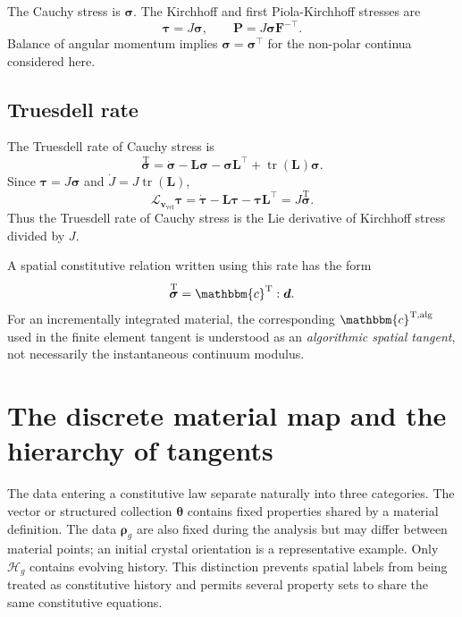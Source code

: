 \documentclass[11pt,a4paper]{article}
\newcommand{\bs}[1]{\boldsymbol{#1}}
\newcommand{\tr}{\operatorname{tr}}
\newcommand{\F}{\bs{F}}
\newcommand{\Pstress}{\bs{P}}
\newcommand{\sig}{\bs{\sigma}}
\newcommand{\tauK}{\bs{\tau}}
\newcommand{\Lten}{\bs{L}}
\newcommand{\dten}{\bs{d}}
\newcommand{\cT}{\mathbbm{c}^{\mathrm{T}}}
\newcommand{\calgT}{\mathbbm{c}^{\mathrm{T,alg}}}
\begin{document}
The Cauchy stress is $\sig$. The Kirchhoff and first Piola-Kirchhoff stresses are
\begin{equation}
\tauK=J\sig,
\qquad
\Pstress=J\sig\F^{-\top}.
\label{eq:stress-transform}
\end{equation}
Balance of angular momentum implies $\sig=\sig^\top$ for the non-polar continua considered here.

\subsection{Truesdell rate}

The Truesdell rate of Cauchy stress is
\begin{equation}
\overset{\mathrm{T}}{\sig}
=
\dot{\sig}
-\Lten\sig
-\sig\Lten^\top
+\tr(\Lten)\sig.
\label{eq:truesdell}
\end{equation}
Since $\tauK=J\sig$ and $\dot J=J\tr(\Lten)$,
\begin{equation}
\mathcal{L}_{\bs v_{\mathrm{vel}}}\tauK
=
\dot{\tauK}-\Lten\tauK-\tauK\Lten^\top
=
J\overset{\mathrm{T}}{\sig}.
\end{equation}
Thus the Truesdell rate of Cauchy stress is the Lie derivative of Kirchhoff stress divided by $J$.

A spatial constitutive relation written using this rate has the form
\begin{equation}
\overset{\mathrm{T}}{\sig}
=\cT:\dten.
\label{eq:truesdell-constitutive}
\end{equation}
For an incrementally integrated material, the corresponding $\calgT$ used in the finite element tangent is understood as an \emph{algorithmic spatial tangent}, not necessarily the instantaneous continuum modulus.

\section{The discrete material map and the hierarchy of tangents}

The data entering a constitutive law separate naturally into three categories. The vector or structured collection $\boldsymbol\theta$ contains fixed properties shared by a material definition. The data $\boldsymbol\rho_g$ are also fixed during the analysis but may differ between material points; an initial crystal orientation is a representative example. Only $\mathcal H_g$ contains evolving history. This distinction prevents spatial labels from being treated as constitutive history and permits several property sets to share the same constitutive equations.
\end{document}
